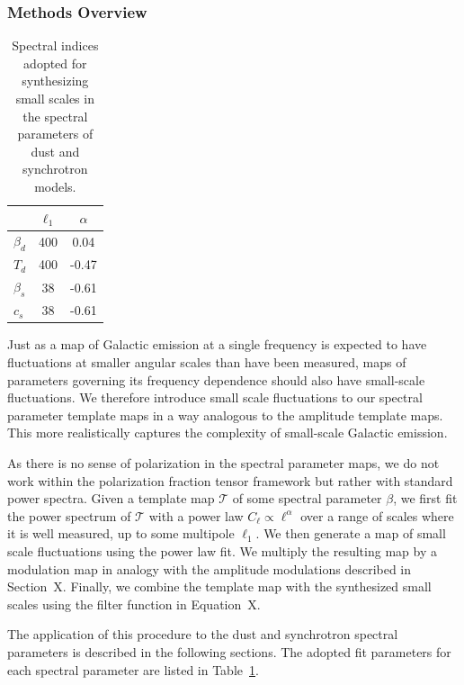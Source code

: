 \documentclass[twocolumn]{aastex631}
\newcommand{\giuse}[1]{\textcolor{orange}{(GP: #1)}}
\begin{document}
\subsubsection{Methods Overview}
\begin{table}
    \centering
    \begin{tabular}{lcc}
    \toprule 
   &   $ \ell_1   $    &$\alpha$  \\
   \midrule  
   $\beta_d$ & 400 & 0.04 \\ 
   $T_d$  &  400  & -0.47\\
    \midrule 
    $\beta_s$ & 38 & -0.61\\
    $c_s$ & 38 &  -0.61  \\ 
   \bottomrule
    \end{tabular}
    \caption{Spectral indices adopted for synthesizing  small scales in the spectral parameters of dust and synchrotron models. }
    \label{tab:smallscale_specpar}
\end{table}

Just as a map of Galactic emission at a single frequency is expected to have fluctuations at smaller angular scales than have been measured, maps of parameters governing its frequency dependence should also have small-scale fluctuations. We therefore introduce small scale fluctuations to our spectral parameter template maps in a way analogous to the amplitude template maps. This more realistically captures the complexity of small-scale Galactic emission.

As there is no sense of polarization in the spectral parameter maps, we do not work within the polarization fraction tensor framework but rather with standard power spectra. Given a template map $\mathcal{T}$ of some spectral parameter $\beta$, we first fit the power spectrum of $\mathcal{T}$ with a power law $C_\ell \propto \ell^\alpha$ over a range of scales where it is well measured, up to some multipole $\ell_1$. We then generate a map of small scale fluctuations using the power law fit. We multiply the resulting map by a modulation map in analogy with the amplitude modulations described in Section~X. Finally, we combine the template map with the synthesized small scales using the filter function in Equation~X.

The application of this procedure to the dust and synchrotron spectral parameters is described in the following sections. The adopted fit parameters for each spectral parameter are listed in Table~\ref{tab:smallscale_specpar}.
\end{document}
